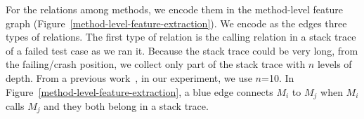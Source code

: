 
For the relations among methods, we encode them in the method-level
feature graph (Figure~\ref{method-level-feature-extraction}). We
encode as the edges three types of relations. The first type of
relation is the calling relation in a stack trace of a failed test
case as we ran it. Because the stack trace could be very long, from
the failing/crash position, we collect only part of the stack trace
with $n$ levels of depth. From a previous work~\cite{sungkim-issta},
in our experiment, we use $n$=10. In
Figure~\ref{method-level-feature-extraction}, a blue edge connects $M_i$
to $M_j$ when $M_i$ calls $M_j$ and they both belong in a stack trace.

